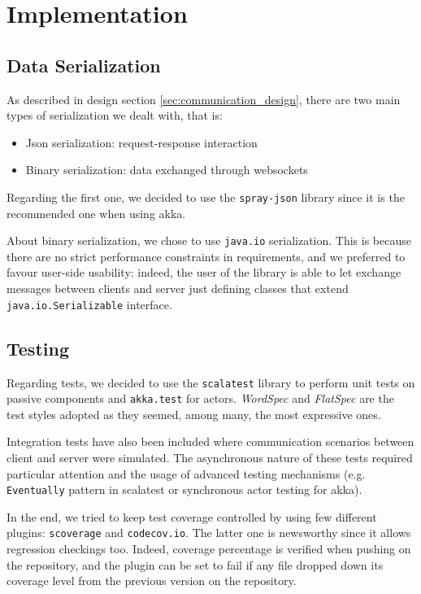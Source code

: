 \chapter{Implementation}
\section{Data Serialization}
As described in design section \ref{sec:communication_design}, there are two main types of serialization we dealt with, that is:
\begin{itemize}
	\item Json serialization: request-response interaction
	\item Binary serialization: data exchanged through websockets
\end{itemize}
Regarding the first one, we decided to use the \texttt{spray-json} library since it is the recommended one when using akka.

About binary serialization, we chose to use \texttt{java.io} serialization. This is because there are no strict performance constraints in requirements, and we preferred to favour user-side usability: indeed, the user of the library is able to let exchange messages between clients and server just defining classes that extend \texttt{java.io.Serializable} interface.

\section{Testing}
Regarding tests, we decided to use the \texttt{scalatest} library to perform unit tests on passive components and \texttt{akka.test} for actors. \textit{WordSpec} and \textit{FlatSpec} are the test styles adopted as they seemed, among many, the most expressive ones. 

Integration tests have also been included where communication scenarios between client and server were simulated. The asynchronous nature of these tests required particular attention and the usage of advanced testing mechanisms (e.g. \texttt{Eventually} pattern in scalatest or synchronous actor testing for akka).

In the end, we tried to keep test coverage controlled by using few different plugins: \texttt{scoverage} and \texttt{codecov.io}.
The latter one is newsworthy since it allows regression checkings too. Indeed, coverage percentage is verified when pushing on the repository, and the plugin can be set to fail if any file dropped down its coverage level from the previous version on the repository.


